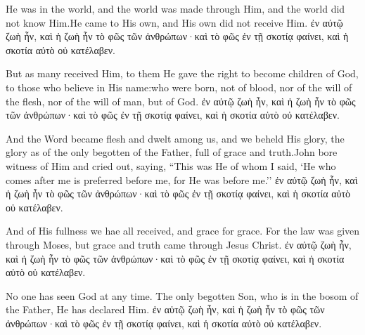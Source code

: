 \newpage

\begin{paracol}{2}
    He was in the world, and the world was made through Him, and the world did not know Him.He came to His own, and His own did not receive Him.
\switchcolumn
 ἐν αὐτῷ ζωὴ ἦν, καὶ ἡ ζωὴ ἦν τὸ φῶς τῶν ἀνθρώπων·καὶ τὸ φῶς ἐν τῇ σκοτίᾳ φαίνει, καὶ ἡ σκοτία αὐτὸ οὐ κατέλαβεν.
\end{paracol}

\newpage

\begin{paracol}{2}
But as many received Him, to them He gave the right to become children of God, to those who believe in His name:who were born, not of blood, nor of the will of the flesh, nor of the will of man, but of God.
\switchcolumn
 ἐν αὐτῷ ζωὴ ἦν, καὶ ἡ ζωὴ ἦν τὸ φῶς τῶν ἀνθρώπων·καὶ τὸ φῶς ἐν τῇ σκοτίᾳ φαίνει, καὶ ἡ σκοτία αὐτὸ οὐ κατέλαβεν.
\end{paracol}

\newpage

\begin{paracol}{2}
And the Word became flesh and dwelt among us, and we beheld His glory, the glory as of the only begotten of the Father, full of grace and truth.John bore witness of Him and cried out, saying, ``This was He of whom I said, `He who comes after me is preferred before me, for He was before me.''
\switchcolumn
 ἐν αὐτῷ ζωὴ ἦν, καὶ ἡ ζωὴ ἦν τὸ φῶς τῶν ἀνθρώπων·καὶ τὸ φῶς ἐν τῇ σκοτίᾳ φαίνει, καὶ ἡ σκοτία αὐτὸ οὐ κατέλαβεν.
\end{paracol}

\newpage

\begin{paracol}{2}
And of His fullness we hae all received, and grace for grace. For the law was given through Moses, but grace and truth came through Jesus Christ.
\switchcolumn
 ἐν αὐτῷ ζωὴ ἦν, καὶ ἡ ζωὴ ἦν τὸ φῶς τῶν ἀνθρώπων·καὶ τὸ φῶς ἐν τῇ σκοτίᾳ φαίνει, καὶ ἡ σκοτία αὐτὸ οὐ κατέλαβεν.
\end{paracol}

\newpage
\begin{paracol}{2}
No one has seen God at any time. The only begotten Son, who is in the bosom of the Father, He has declared Him.
\switchcolumn
 ἐν αὐτῷ ζωὴ ἦν, καὶ ἡ ζωὴ ἦν τὸ φῶς τῶν ἀνθρώπων·καὶ τὸ φῶς ἐν τῇ σκοτίᾳ φαίνει, καὶ ἡ σκοτία αὐτὸ οὐ κατέλαβεν.
\end{paracol}









